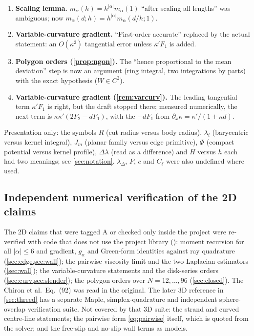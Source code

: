 \begin{enumerate}
\item \textbf{Scaling lemma.} $m_\alpha(h)=h^{|\alpha|}m_\alpha(1)$ ``after scaling all lengths'' was ambiguous; now $m_\alpha(d;h)=h^{|\alpha|}m_\alpha(d/h;1)$.
\item \textbf{Variable-curvature gradient.} ``First-order accurate'' replaced by the actual statement: an $O(\kappa^2)$ tangential error unless $\kappa'F_1$ is added.
\item \textbf{Polygon orders (\cref{prop:ngon}).} The ``hence proportional to the mean deviation'' step is now an argument (ring integral, two integrations by parts) with the exact hypothesis ($W\in C^2$).
\item \textbf{Variable-curvature gradient (\cref{rem:varcurv}).} The leading tangential term $\kappa'F_1$ is right, but the draft stopped there; measured numerically, the next term is $\kappa\kappa'(2F_2-dF_1)$, with the $-dF_1$ from $\partial_x\kappa=\kappa'/(1+\kappa d)$.
\end{enumerate}
Presentation only: the symbols $R$ (cut radius versus body radius), $\lambda_i$ (barycentric versus kernel integral), $J_m$ (planar family versus edge primitive), $\Phi$ (compact potential versus
kernel profile), $\Delta\lambda$ (read as a difference) and $H$ versus $h$ each had two meanings; see \cref{sec:notation}. $\lambda_\Delta$, $P$, $c$ and $C_\ell$ were also undefined where used.

\subsection{Independent numerical verification of the 2D claims}
The 2D claims that were tagged \textsf{A} or checked only inside the project were re-verified with code that does not use the project library
(): moment recursion for all $|\alpha|\le6$ and gradient, $g_\alpha$ and Green-form identities against ray quadrature
(\cref{sec:edge,sec:wall}); the pairwise-viscosity limit and the two Laplacian estimators (\cref{sec:wall}); the variable-curvature statements and the disk-series orders
(\cref{sec:curv,sec:slender}); the polygon orders over $N=12,\dots,96$ (\cref{sec:closed}). The Chiron et al.\ Eq.~(92) was read in the original.
The later 3D reference in \cref{sec:threed} has a separate Maple, simplex-quadrature
and independent sphere-overlap verification suite. Not covered by that 3D suite:
the strand and curved centre-line statements; the pairwise form \cref{eq:pairwise}
itself, which is quoted from the solver; and the free-slip and no-slip wall terms as models.
